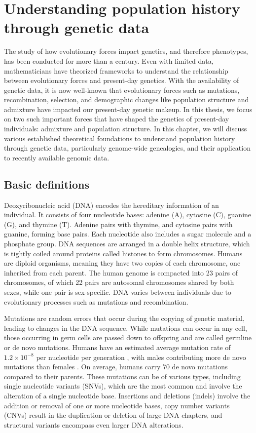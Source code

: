 \section{Understanding population history through genetic data}

The study of how evolutionary forces impact genetics, and therefore phenotypes, has been conducted for more than a century. Even with limited data, mathematicians have theorized frameworks to understand the relationship between evolutionary forces and present-day genetics. With the availability of genetic data, it is now well-known that evolutionary forces such as mutations, recombination, selection, and demographic changes like population structure and admixture have impacted our present-day genetic makeup. In this thesis, we focus on two such important forces that have shaped the genetics of present-day individuals: admixture and population structure. In this chapter, we will discuss various established theoretical foundations to understand population history through genetic data, particularly genome-wide genealogies, and their application to recently available genomic data.

\subsection{Basic definitions}

Deoxyribonucleic acid (DNA) encodes the hereditary information of an individual. It consists of four nucleotide bases: adenine (A), cytosine (C), guanine (G), and thymine (T). Adenine pairs with thymine, and cytosine pairs with guanine, forming base pairs. Each nucleotide also includes a sugar molecule and a phosphate group. DNA sequences are arranged in a double helix structure, which is tightly coiled around proteins called histones to form chromosomes. Humans are diploid organisms, meaning they have two copies of each chromosome, one inherited from each parent. The human genome is compacted into 23 pairs of chromosomes, of which 22 pairs are autosomal chromosomes shared by both sexes, while one pair is sex-specific. DNA varies between individuals due to evolutionary processes such as mutations and recombination.

Mutations are random errors that occur during the copying of genetic material, leading to changes in the DNA sequence. While mutations can occur in any cell, those occurring in germ cells are passed down to offspring and are called germline or de novo mutations. Humans have an estimated average mutation rate of $1.2 \times 10^{-8}$ per nucleotide per generation \cite{Kong2012}, with males contributing more de novo mutations than females \cite{Harris2019}. On average, humans carry 70 de novo mutations compared to their parents. These mutations can be of various types, including single nucleotide variants (SNVs), which are the most common and involve the alteration of a single nucleotide base. Insertions and deletions (indels) involve the addition or removal of one or more nucleotide bases, copy number variants (CNVs) result in the duplication or deletion of large DNA chapters, and structural variants encompass even larger DNA alterations.

